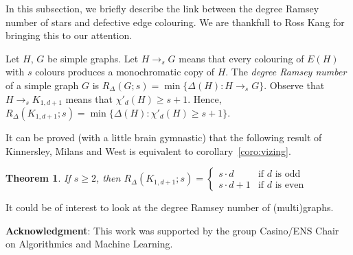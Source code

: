 \documentclass[11pt]{article}
\newtheorem{theorem}[lemma]{Theorem}
\begin{document}
In this subsection, we briefly describe the link between the degree Ramsey number of stars and defective edge colouring. We are thankfull to Ross Kang for bringing this to our attention.    

Let $H$, $G$ be simple graphs. Let $H \rightarrow_s G$ means that every colouring of $E(H)$ with $s$ colours produces a monochromatic copy of $H$. 
The \textit{degree Ramsey number} of a simple graph $G$ is $R_{\Delta}(G;s) = \min\{\Delta(H): H \rightarrow_s G\}$. 
Observe that $H \rightarrow_s K_{1,d+1}$ means that $\chi'_d(H) \geq s+1$. Hence,  $R_{\Delta}(K_{1,d+1};s) = \min\{\Delta(H): \chi'_d(H) \geq s+1\}$. 

It can be proved (with a little brain gymnastic) that the following result of Kinnersley, Milans and West is equivalent to corollary~\ref{coro:vizing}. 

\begin{theorem}\cite{kinnersley_milans_west_2012}
If $s \geq 2$, then 
$
R_{\Delta}(K_{1,d+1}; s) = \left\{
    \begin{array}{ll}
       s\cdot d & \mbox{if } d \mbox{ is odd} \\
        s\cdot d +1 &  \mbox{if } d \mbox{ is even}
    \end{array}
\right.
$
\end{theorem}

It could be of interest to look at the degree Ramsey number of (multi)graphs. 
\bigskip


{\bf Acknowledgment}: 
This work was supported by the group Casino/ENS Chair on Algorithmics and Machine Learning.
\end{document}
